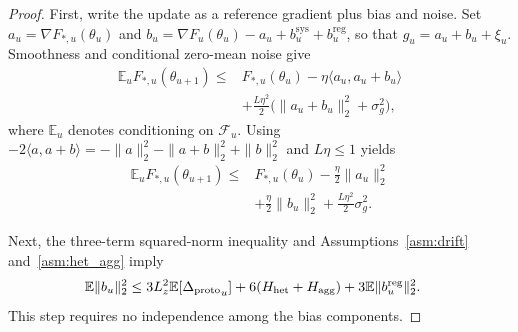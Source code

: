\begin{proof}
\iffalse
First, write the update as a reference gradient plus bias and noise. Set $a_u=\nabla F_{*,u}(\theta_u)$ and
$b_u=\nabla F_u(\theta_u)-a_u+
b_u^{\mathrm{sys}}+b_u^{\mathrm{reg}}$,
so that $g_u=a_u+b_u+\xi_u$. Smoothness and conditional zero-mean noise give
\begin{equation}
\begin{split}
 \mathbb E_uF_{*,u}(\theta_{u+1})
 \le{}&F_{*,u}(\theta_u)
 -\eta\langle a_u,a_u+b_u\rangle\\
 &+\frac{L\eta^2}{2}
 \bigl(\|a_u+b_u\|_2^2+\sigma_g^2\bigr),
\end{split}
\label{eq:conditional_descent}
\end{equation}
where $\mathbb E_u$ denotes conditioning on $\mathcal F_u$.
Using
$-2\langle a,a+b\rangle=-\|a\|_2^2-\|a+b\|_2^2+\|b\|_2^2$
and $L\eta\le1$ yields
\begin{equation}
\begin{split}
 \mathbb E_uF_{*,u}(\theta_{u+1})
 \le{}&F_{*,u}(\theta_u)-\frac{\eta}{2}\|a_u\|_2^2\\
 &+\frac{\eta}{2}\|b_u\|_2^2
 +\frac{L\eta^2}{2}\sigma_g^2.
\end{split}
\label{eq:biased_descent}
\end{equation}

Next, the three-term squared-norm inequality and Assumptions~\ref{asm:drift} and~\ref{asm:het_agg} imply
\begin{equation}
\begin{split}
 \mathbb E\|b_u\|_2^2
 \le{}&3L_z^2\mathbb E[{\Delta_{\mathrm{proto}}}_u]
 +6(H_{\mathrm{het}}+H_{\mathrm{agg}})+3\mathbb E\|b_u^{\mathrm{reg}}\|_2^2 .
\end{split}
\label{eq:total_bias_bound}
\end{equation}
This step requires no independence among the bias components.


\end{proof}

